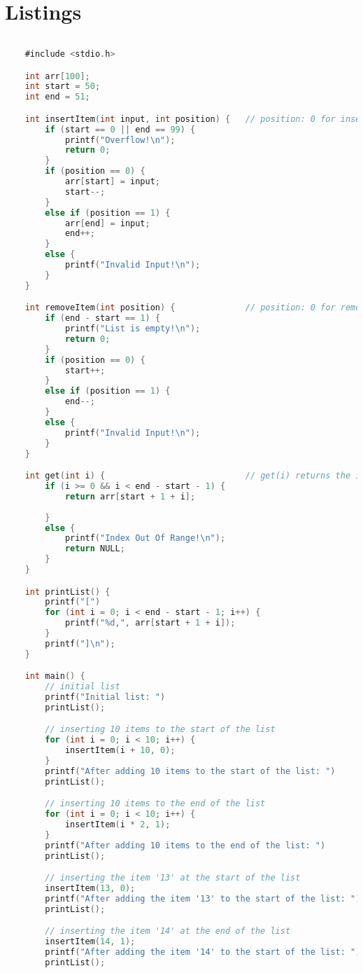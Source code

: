 \documentclass{report}
\begin{document}
\section{Listings}
\begin{lstlisting}[language=C]
	
	#include <stdio.h>

	int arr[100];
	int start = 50;
	int end = 51;

	int insertItem(int input, int position) {   // position: 0 for inserting at the front; 1 for inserting at the end
		if (start == 0 || end == 99) {
			printf("Overflow!\n");
			return 0;
		}
		if (position == 0) {
			arr[start] = input;
			start--;
		}
		else if (position == 1) {
			arr[end] = input;
			end++;
		}
		else {
			printf("Invalid Input!\n");
		}
	}

	int removeItem(int position) {              // position: 0 for removing at the front; 1 for removing at the end
		if (end - start == 1) {
			printf("List is empty!\n");
			return 0;
		}
		if (position == 0) {
			start++;
		}
		else if (position == 1) {
			end--;
		}
		else {
			printf("Invalid Input!\n");
		}
	}

	int get(int i) {                            // get(i) returns the item in the list at index i
		if (i >= 0 && i < end - start - 1) {
			return arr[start + 1 + i];
			
		}
		else {
			printf("Index Out Of Range!\n");
			return NULL;
		}
	}

	int printList() {
		printf("[")
		for (int i = 0; i < end - start - 1; i++) {
			printf("%d,", arr[start + 1 + i]);
		}
		printf("]\n");
	}

	int main() {
		// initial list
		printf("Initial list: ")
		printList();

		// inserting 10 items to the start of the list
		for (int i = 0; i < 10; i++) {
			insertItem(i + 10, 0);
		}
		printf("After adding 10 items to the start of the list: ")
		printList();

		// inserting 10 items to the end of the list
		for (int i = 0; i < 10; i++) {
			insertItem(i * 2, 1);
		}
		printf("After adding 10 items to the end of the list: ")
		printList();

		// inserting the item '13' at the start of the list
		insertItem(13, 0);
		printf("After adding the item '13' to the start of the list: ")
		printList();

		// inserting the item '14' at the end of the list
		insertItem(14, 1);
		printf("After adding the item '14' to the start of the list: ")
		printList();


\end{lstlisting}
\end{document}
